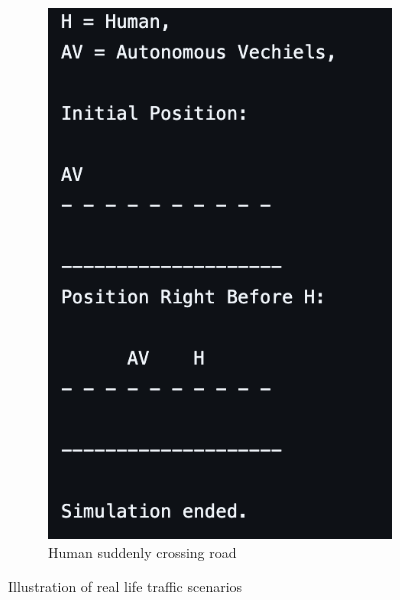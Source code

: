 \documentclass[conference]{IEEEtran}
\begin{document}
\begin{figure}[h]
\begin{subfigure}[b]{0.3\textwidth}
        \includegraphics[width=\linewidth]{Fig/Human_reasoning_S3.png}
        \caption{Human suddenly crossing road}
    \end{subfigure}
    \caption{Illustration of real life traffic scenarios}
    \label{fig:llm_outputs}
\end{figure}
\end{document}
